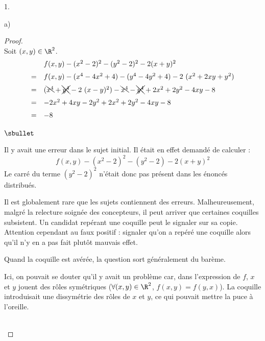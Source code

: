 \documentclass[11pt]{article}%
\begin{document}
\begin{noliste}{1.}
\begin{noliste}{a)}
    \begin{proof}~\\%
      Soit $(x, y) \in \R^2$.
      \[
      \begin{array}{cl}
        & f(x, y) -(x^{2}-2)^{2}-(y^{2}-2)^{2}-2(x + y)^{2}
        \\[.2cm]
        = & f(x, y) -(x^4 - 4 x^2 + 4) - (y^4 - 4 y^2 + 4) - 2 \ (x^2
        + 2 xy + y^2)
        \\[.2cm]
        = & (\bcancel{x^4} + \xcancel{y^4} - 2 \ (x - y)^2) -
        \bcancel{x^4} - \xcancel{y^4} +2 x^2 + 2 y^2 -4  xy - 8
        \\[.2cm]
        = & - 2 x^2 + 4 xy - 2 y^2 + 2 x^2 + 2 y^2 -4  xy - 8
        \\[.2cm]
        = & - 8
      \end{array}
      \]
      \begin{remark}%
        \begin{noliste}{$\sbullet$}
        \item Il y avait une erreur dans le sujet initial. Il était en
          effet demandé de calculer :
          \[
          f(x, y) - (x^{2}-2)^{2} - (y^{2}-2) - 2(x + y)^{2}
          \]
          Le carré du terme $(y^{2}-2)^2$ n'était donc pas présent
          dans les énoncés distribués.
        \item Il est globalement rare que les sujets contiennent des
          erreurs. Malheureusement, malgré la relecture soignée des
          concepteurs, il peut arriver que certaines coquilles
          subsistent. Un candidat repérant une coquille peut le
          signaler sur sa copie. Attention cependant au faux positif :
          signaler qu'on a repéré une coquille alors qu'il n'y en a
          pas fait plutôt mauvais effet.
        \item Quand la coquille est avérée, la question sort
          généralement du barème.
        \item Ici, on pouvait se douter qu'il y avait un problème car,
          dans l'expression de $f$, $x$ et $y$ jouent des rôles
          symétriques ($\forall (x, y) \in \R^2$, $f(x, y) = f(y,
          x)$). La coquille introduisait une dissymétrie des rôles de
          $x$ et $y$, ce qui pouvait mettre la puce à l'oreille.
        \end{noliste}
      \end{remark}~\\[-1cm]
    \end{proof}



\end{noliste}
\end{noliste}
\end{document}
